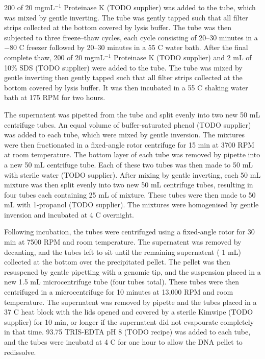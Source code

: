 200 \microlitre{} of 20 mgmL$^{-1}$ Proteinase K (TODO supplier) was added to the tube, which was mixed by gentle inverting.
The tube was gently tapped such that all filter strips collected at the bottom covered by lysis buffer.
The tube was then subjected to three freeze--thaw cycles, each cycle consisting of 20--30 minutes in a $-80$ \textdegrees{}C freezer followed by 20--30 minutes in a 55 \textdegrees{}C water bath.
After the final complete thaw, 200 \microlitre{} of 20 mgmL$^{-1}$ Proteinase K (TODO supplier) and 2 mL of 10\% SDS (TODO supplier) were added to the tube.
The tube was mixed by gentle inverting then gently tapped such that all filter strips collected at the bottom covered by lysis buffer.
It was then incubated in a 55 \textdegrees{}C shaking water bath at 175 RPM for two hours.

The supernatent was pipetted from the tube and split evenly into two new 50 mL centrifuge tubes.
An equal volume of buffer-saturated phenol (TODO supplier) was added to each tube, which were mixed by gentle inversion.
The mixtures were then fractionated in a fixed-angle rotor centrifuge for 15 min at 3700 RPM at room temperature.
The bottom layer of each tube was removed by pipette into a new 50 mL centrifuge tube.
Each of these two tubes was then made to 50 mL with sterile water (TODO supplier).
After mixing by gentle inverting, each 50 mL mixture was then split evenly into two new 50 mL centrifuge tubes, resulting in four tubes each containing 25 mL of mixture.
These tubes were then made to 50 mL with 1-propanol (TODO supplier).
The mixtures were homogenised by gentle inversion and incubated at 4 \textdegrees{}C overnight.

Following incubation, the tubes were centrifuged using a fixed-angle rotor for 30 min at 7500 RPM and room temperature.
The supernatent was removed by decanting, and the tubes left to sit until the remaining supernatent (\textapprox{} 1 mL) collected at the bottom over the precipitated pellet.
The pellet was then resuspened by gentle pipetting with a genomic tip, and the suspension placed in a new 1.5 mL microcentrifuge tube (four tubes total).
These tubes were then centrifuged in a microcentrifuge for 10 minutes at 13,000 RPM and room temperature.
The supernatent was removed by pipette and the tubes placed in a 37 \textdegrees{}C heat block with the lids opened and covered by a sterile Kimwipe (TODO supplier) for 10 min, or longer if the supernatent did not evapourate completely in that time.
93.75 \microlitre{} TRIS-EDTA pH 8 (TODO recipe) was added to each tube, and the tubes were incubatd at 4 \textdegrees{}C for one hour to allow the DNA pellet to redissolve.


